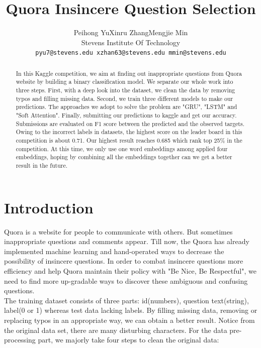 \documentclass{article}
\title{Quora Insincere Question Selection}
\author{%
  Peihong Yu\quad  Xinru Zhang\quad Mengjie Min\\
  Stevens Institute Of Technology\\
  \texttt{pyu7@stevens.edu\quad
  	xzhan63@stevens.edu\quad
  	mmin@stevens.edu} \\
}
\begin{document}

\maketitle
\begin{abstract}
	In this Kaggle competition, we aim at finding out inappropriate questions from Quora website by building a binary classification model. We separate our whole work into three steps. First, with a deep look into the dataset, we clean the data by removing typos and filling missing data. Second, we train three different models to make our predictions. The approaches we adopt to solve the problem are "GRU", "LSTM" and "Soft Attention". Finally, submitting our predictions to kaggle and get our accuracy. Submissions are evaluated on F1 score between the predicted and the observed targets.  Owing to the incorrect labels in datasets, the highest score on the leader board in this competition is about 0.71. Our highest result reaches 0.685 which rank top 25\% in the competition. At this time, we only use one word embeddings among applied four embeddings, hoping by combining all the embeddings together can we get a better result in the future.\\
\end{abstract}
\setlength{\parskip}{0.3em}
\section{Introduction}
\noindent Quora is a website for people to communicate with others. But sometimes inappropriate questions and comments appear. Till now, the Quora has already implemented machine learning and hand-operated ways to decrease the possibility of insincere questions. In order to combat insincere questions more efficiency and help Quora maintain their policy with "Be Nice, Be Respectful", we need to find more up-gradable ways to discover these ambiguous and confusing questions.\\

\noindent The training dataset consists of three parts: id(numbers), question text(string), label(0 or 1) whereas test data lacking labels. By filling missing data, removing or replacing typos in an appropriate way, we can obtain a better result. Notice from the original data set, there are many disturbing characters. For the data pre-processing part, we majorly take four steps to clean the original data: \\
\end{document}
